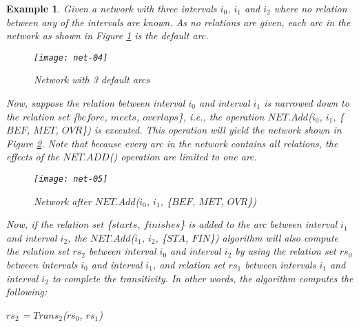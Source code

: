 \documentclass[11pt]{report}
\newtheorem{vexample}{Example}[chapter]
\newenvironment{vquote}
{
  \begin{list}{}{\leftmargin 1em}\item[]
}
{
  \end{list}
}
\begin{document}
          \begin{vexample}
            \label{ex-1}
            Given a network with three intervals $i_0$, $i_1$ and $i_2$ where
            no relation between any of the intervals are known. As no relations
            are given, each arc in the network as shown in Figure
            \ref{fig-net-ex-04} is the default arc.

            \begin{figure}[[tbhp]
              \begin{center}
                \texttt{[image: net-04]}
                \caption{Network with 3 default arcs}
                \label{fig-net-ex-04}
              \end{center}
            \end{figure}

            Now, suppose the relation between interval $i_0$ and interval $i_1$
            is narrowed down to the relation set \{$before$, $meets$,
            $overlaps$\}, i.e., the operation $NET.Add$($i_0$, $i_1$, \{$BEF$,
            $MET$, $OVR$\}) is executed. This operation will yield the network
            shown in Figure \ref{fig-net-ex-05}. Note that because every arc
            in the network contains all relations, the effects of the
            $NET.ADD$() operation are limited to one arc.

            \begin{figure}[[tbhp]
              \begin{center}
                \texttt{[image: net-05]}
                \caption{Network after $NET.Add$($i_0$, $i_1$, \{$BEF$, $MET$, $OVR$\})}
                \label{fig-net-ex-05}
              \end{center}
            \end{figure}

            Now, if the relation set \{$starts$, $finishes$\} is added to the
            arc between interval $i_1$ and interval $i_2$, the $NET.Add$($i_1$,
            $i_2$, \{$STA$, $FIN$\}) algorithm will also compute the relation
            set $rs_2$ between interval $i_0$ and interval $i_2$ by using the
            relation set $rs_0$ between intervals $i_0$ and interval $i_1$, and
            relation set $rs_1$ between intervals $i_1$ and interval $i_2$ to
            complete the transitivity. In other words, the algorithm computes
            the following:

            \begin{vquote}
              $rs_2$ = $Trans_2$($rs_0$, $rs_1$)


\end{vquote}
\end{vexample}
\end{document}
